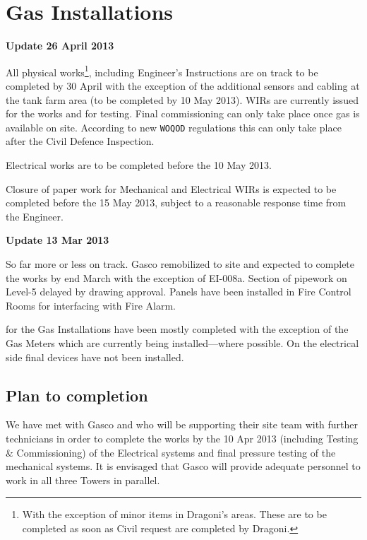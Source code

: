 \chapter{Gas Installations}
\begin{update}
\centerline{\textbf{Update 26 April 2013}}
All physical works\footnote{With the exception of minor items in Dragoni's areas. These are to be completed as soon as Civil request are completed by Dragoni.}, including Engineer's Instructions are on track to be completed by 30 April with the exception of the additional sensors and cabling at the tank farm area (to be completed by 10 May 2013). WIRs are currently issued for the works and for testing. Final commissioning can only take place once gas is available on site. According to new \texttt{WOQOD} regulations this can only take place after the Civil Defence Inspection.

Electrical works are to be completed before the 10 May 2013.

Closure of paper work for Mechanical and Electrical WIRs is expected to be completed before the 15 May 2013, subject to a reasonable response time from the Engineer.
\end{update}


\begin{update}
\centerline{\textbf{Update 13 Mar 2013}}
So far more or less on track. Gasco remobilized to site and expected to complete the works by end March with the exception of EI-008a. Section of pipework on Level-5 delayed by drawing approval. Panels
have been installed in Fire Control Rooms for interfacing with Fire Alarm.
\end{update}

 for the Gas Installations have been mostly completed with the exception of the Gas Meters which are currently being installed---where possible. On the electrical side final devices have not been installed. 

\section{Plan to completion}

We have met with Gasco and who will be supporting their site team with further technicians in order to complete the works by the 10 Apr 2013 (including Testing \& Commissioning) of the Electrical systems and final pressure testing of the mechanical systems. It is envisaged that Gasco will provide adequate personnel to
work in all three Towers in parallel.


